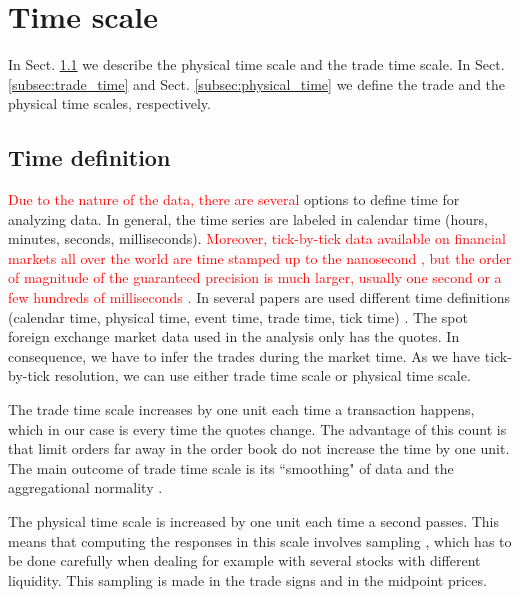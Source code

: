 \section{Time scale}\label{sec:time_scale}

In Sect. \ref{subsec:time_definition} we describe the physical time scale and
the trade time scale. In Sect. \ref{subsec:trade_time} and Sect.
\ref{subsec:physical_time} we define the trade and the physical time scales,
respectively.

\subsection{Time definition}\label{subsec:time_definition}

\textcolor{red}{Due to the nature of the data, there are several} options to define time for
analyzing data. In general, the time series are labeled in calendar time
(hours, minutes, seconds, milliseconds). \textcolor{red}{Moreover, tick-by-tick data available
on financial markets all over the world are time stamped up to the nanosecond \cite{xetra},
but the order of magnitude of the guaranteed precision is much larger, usually
one second or a few hundreds of milliseconds
\cite{market_digest,empirical_facts}.} In several papers are used different time
definitions (calendar time, physical time, event time, trade time, tick time)
\cite{empirical_facts,sampling_returns,market_making}. The spot foreign
exchange market data used in the analysis only has the quotes. In consequence,
we have to infer the trades during the market time. As we have tick-by-tick
resolution, we can use either trade time scale or physical time scale.

The trade time scale increases by one unit each time a transaction happens,
which in our case is every time the quotes change. The advantage of this count
is that limit orders far away in the order book do not increase the time by one
unit. The main outcome of trade time scale is its ``smoothing" of data and the
aggregational normality \cite{empirical_facts}.

The physical time scale is increased by one unit each time a second passes.
This means that computing the responses in this scale involves sampling
\cite{Wang_2016_cross,sampling_returns}, which has to be done carefully when
dealing for example with several stocks with different liquidity. This sampling
is made in the trade signs and in the midpoint prices.

